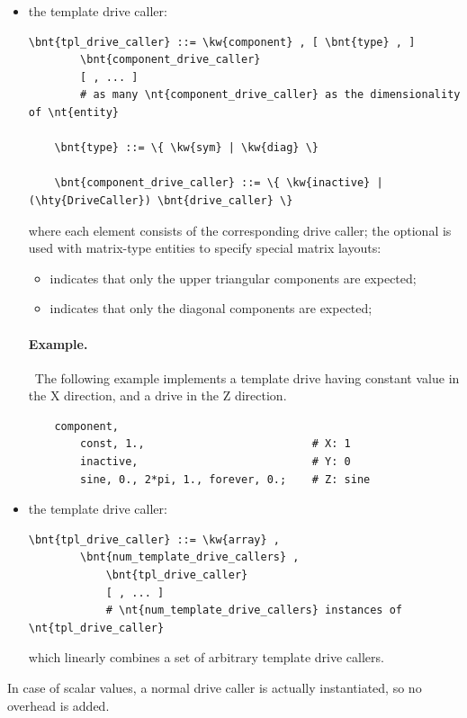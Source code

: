 \begin{itemize}
\item the  template drive caller:
\begin{Verbatim}[commandchars=\\\{\}]
    \bnt{tpl_drive_caller} ::= \kw{component} , [ \bnt{type} , ]
        \bnt{component_drive_caller}
        [ , ... ]
        # as many \nt{component_drive_caller} as the dimensionality of \nt{entity}

    \bnt{type} ::= \{ \kw{sym} | \kw{diag} \}

    \bnt{component_drive_caller} ::= \{ \kw{inactive} | (\hty{DriveCaller}) \bnt{drive_caller} \}
\end{Verbatim}
where each element consists of the corresponding drive caller;
the optional  is used with matrix-type entities to specify
special matrix layouts:
\begin{itemize}
\item {} indicates that only the upper triangular components are expected;
\item {} indicates that only the diagonal components are expected;
\end{itemize}

\paragraph{Example.} \
The following example implements a  template drive having constant value in the X direction, and a  drive in the Z direction.
\begin{verbatim}
    component,
        const, 1.,                          # X: 1
        inactive,                           # Y: 0
        sine, 0., 2*pi, 1., forever, 0.;    # Z: sine
\end{verbatim}

\item the  template drive caller:
\begin{Verbatim}[commandchars=\\\{\}]
    \bnt{tpl_drive_caller} ::= \kw{array} ,
        \bnt{num_template_drive_callers} ,
            \bnt{tpl_drive_caller}
            [ , ... ]
            # \nt{num_template_drive_callers} instances of \nt{tpl_drive_caller}
\end{Verbatim}
which linearly combines a set of arbitrary template drive callers.
\end{itemize}
In case of scalar values, a normal drive caller is actually instantiated,
so no overhead is added.

